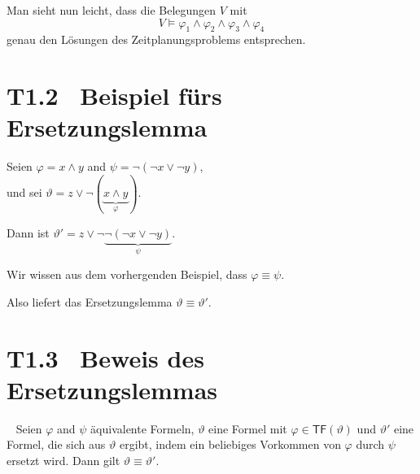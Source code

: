 \documentclass[fontsize=11pt, twoside=false, numbers=autoenddot]{scrbook}
\begin{document}
Man sieht nun leicht, dass die Belegungen $V$ mit
\[
  V \models \varphi_1 \wedge \varphi_2 \wedge \varphi_3 \wedge \varphi_4
\]
genau den Lösungen des Zeitplanungsproblems entsprechen.

\section*{T1.2~ Beispiel fürs Ersetzungslemma}

Seien $\varphi = x \land y$ and $\psi = \lnot(\lnot x \lor \lnot y)$, \\
und sei $\vartheta = z \lor \lnot (\underbrace{x \land y}_{\varphi})$.

Dann ist $\vartheta' = z \lor \lnot \underbrace{\lnot(\lnot x \lor \lnot y)}_{\psi}$.

Wir wissen aus dem vorhergenden Beispiel, dass $\varphi \equiv \psi$.

Also liefert das Ersetzungslemma $\vartheta \equiv \vartheta'$.

\section*{T1.3~ Beweis des Ersetzungslemmas}

~
Seien $\varphi$ and $\psi$ äquivalente Formeln,
$\vartheta$ eine Formel mit $\varphi \in \textsf{TF}(\vartheta)$
und $\vartheta'$ eine Formel, die sich aus $\vartheta$ ergibt,
indem ein beliebiges Vorkommen von $\varphi$ durch $\psi$ ersetzt wird.
Dann gilt $\vartheta \equiv \vartheta'$.
\end{document}
